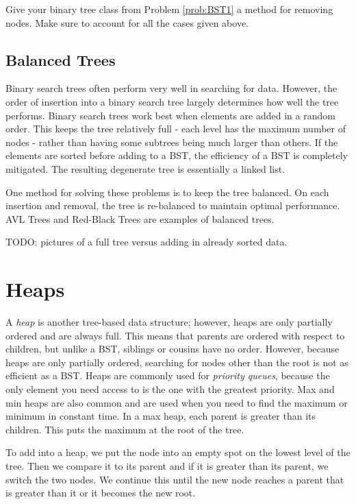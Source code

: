 \begin{problem}
Give your binary tree class from Problem \ref{prob:BST1} a method for removing nodes.
Make sure  to account for all the cases given above.
\label{prob:BST2}
\end{problem}

\subsection*{Balanced Trees}
Binary search trees often perform very well in searching for data.
However, the order of insertion into a binary search tree largely determines how well the tree performs.
Binary search trees work best when elements are added in a random order.
This keeps the tree relatively full - each level has the maximum number of nodes -  rather than having some subtrees being much larger than others.
If the elements are sorted before adding to a BST, the efficiency of a BST is completely mitigated.
The resulting degenerate tree is essentially a linked list.

One method for solving these problems is to keep the tree balanced.
On each insertion and removal, the tree is re-balanced to maintain optimal performance.
AVL Trees and Red-Black Trees are examples of balanced trees.

TODO: pictures of a full tree versus adding in already sorted data.

\section*{Heaps}

A \emph{heap} is another tree-based data structure; however, heaps are only partially ordered and are always full.
This means that parents are ordered with respect to children, but unlike a BST, siblings or cousins have no order.
However, because heaps are only partially ordered, searching for nodes other than the root is not as efficient as a BST.
Heaps are commonly used for \emph{priority queues}, because the only element you need access to is the one with the greatest priority.
Max and min heaps are also common and are used when you need to find the maximum or minimum in constant time.
In a max heap, each parent is greater than its children.
This puts the maximum at the root of the tree.


To add into a heap, we put the node into an empty spot on the lowest level of the tree.
Then we compare it to its parent and if it is greater than its parent, we switch the two nodes.
We continue this until the new node reaches a parent that is greater than it or it becomes the new root.

